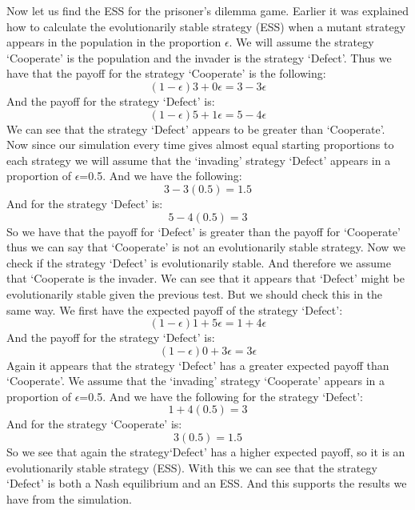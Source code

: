 \documentclass{article}
\begin{document}
Now let us find the ESS for the prisoner's dilemma game. Earlier it was explained how to calculate the evolutionarily stable strategy (ESS) when a mutant strategy appears in the population in the proportion $\epsilon$. We will assume the strategy  `Cooperate' is the population and the invader is the strategy `Defect'. Thus we have that the payoff for the strategy `Cooperate' is the following:
\begin{equation}
(1-{\epsilon})3 + 0{\epsilon} = 3 - 3{\epsilon}
\end{equation}
And the payoff for the strategy `Defect' is:
\begin{equation}
(1-{\epsilon})5 + 1{\epsilon} = 5 - 4{\epsilon}
\end{equation}
We can see that the strategy `Defect' appears to be greater than `Cooperate'. Now since our simulation every time gives almost equal starting proportions to each strategy we will assume that the `invading' strategy `Defect' appears in a proportion of $\epsilon$=0.5. And we have the following:
\begin{equation}
3 - 3(0.5) = 1.5
\end{equation}
And for the strategy `Defect' is:
\begin{equation}
 5 - 4(0.5) = 3
\end{equation}
So we have that the payoff for `Defect' is greater than the payoff for `Cooperate' thus we can say that `Cooperate' is not an evolutionarily stable strategy.
Now we check if the strategy `Defect' is evolutionarily stable. And therefore we assume that `Cooperate is the invader. We can see that it appears that `Defect' might be evolutionarily stable given the previous test. But we should check this in the same way. We first have the expected payoff of the strategy `Defect':
\begin{equation}
(1-{\epsilon})1 + 5{\epsilon} = 1 + 4{\epsilon}
\end{equation}
And the payoff for the strategy `Defect' is:
\begin{equation}
(1-{\epsilon})0 + 3{\epsilon} =  3{\epsilon}
\end{equation}
Again it appears that the strategy `Defect' has a greater expected payoff than `Cooperate'. We assume that the `invading' strategy `Cooperate' appears in a proportion of $\epsilon$=0.5. And we have the following for the strategy `Defect':
\begin{equation}
1 +  4(0.5) = 3
\end{equation}
And for the strategy `Cooperate' is:
\begin{equation}
 3(0.5) = 1.5
\end{equation}
So we see that again the strategy`Defect' has a higher expected payoff, so it is an evolutionarily stable strategy (ESS).
With this we can see that the strategy `Defect' is both a Nash equilibrium and an ESS. And this supports the results we have from the simulation.
\end{document}
